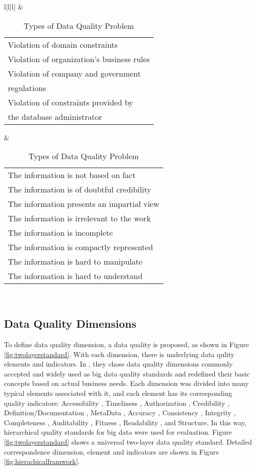 \documentclass[pdftex,english,oribibl]{llncs}
\begin{document}
\begin{table}[]
\begin{tabular}{l|l|l|}
   & \begin{tabular}[c]{@{}l@{}}Violation of domain constraints \\ Violation of organization's business rules\\ Violation of company and government\\ regulations \\ Violation of constraints provided by\\  the database administrator\end{tabular}                              & \begin{tabular}[c]{@{}l@{}}The information is not based on fact \\ The information is of doubtful credibility\\ The information presents an impartial view\\ The information is irrelevant to the work\\ The information is incomplete\\ The information is compactly represented\\ The information is hard to manipulate \\ The information is hard to understand\end{tabular} \\ \hline
\end{tabular}
\caption{Types of Data Quality Problem}
\label{table:DataQualityProblem}
\end{table}


\subsection{Data Quality Dimensions}\label{sec:DataQualityDimensions}

To define data quality dimension, a data quality is proposed, as shown in Figure \ref{fig:twolayerstandard}. With each dimension, there is underlying data qulity elements and indicators.
In \citet{Cai2005ChallnegesOfDataQuality}, they chose data quality dimensions commonly accepted and widely used as big data quality standards and redefined their basic concepts based on actual business needs.
Each dimension was divided into many typical elements associated with it, and each element has its corresponding quality indicators: Accessibility
, Timeliness
, Authorization
, Credibility
, Definition/Documentation
, MetaData
, Accuracy
, Consistency
, Integrity
, Completeness
, Auditability
, Fitness
, Readability
, and Structure.
In this way, hierarchical quality standards for big data were used for evaluation.
Figure \ref{fig:twolayerstandard} shows a universal two-layer data quality standard. Detailed correspondence dimension, element and indicators are shown in Figure \ref{fig:hierachicalframwork}.
\end{document}
